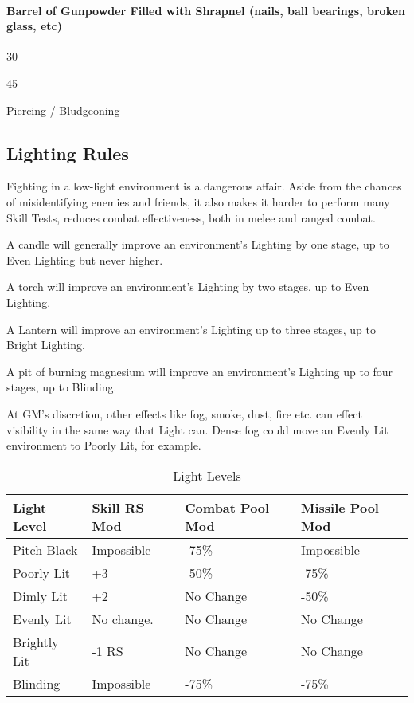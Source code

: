 \documentclass[oneside,11pt,english]{book}
\begin{document}
\paragraph{Barrel of Gunpowder Filled with Shrapnel (nails, ball bearings, broken glass, etc)}
\begin{description}
  [noitemsep]
\item [Radius:] 30
\item [Power:] 45
\item [Type:] Piercing / Bludgeoning
\end{description}

\subsection{Lighting Rules}
\label{sec:lighting-rules}
Fighting in a low-light environment is a dangerous affair. Aside from the
chances of misidentifying enemies and friends, it also makes it harder to
perform many Skill Tests, reduces combat effectiveness, both in melee and ranged
combat.

A candle will generally improve an environment’s Lighting by one stage, up to
Even Lighting but never higher.

A torch will improve an environment’s Lighting by two stages, up to Even
Lighting.

A Lantern will improve an environment’s Lighting up to three stages, up to
Bright Lighting.

A pit of burning magnesium will improve an environment’s Lighting up to four
stages, up to Blinding.

At GM’s discretion, other effects like fog, smoke, dust, fire etc. can effect
visibility in the same way that Light can. Dense fog could move an Evenly Lit
environment to Poorly Lit, for example.
\begin{table}
  \caption{Light Levels}
  \label{tab:light-levels}
  \begin{tabu} to 
    Light Level  & Skill RS Mod & Combat Pool Mod & Missile Pool Mod \\ \toprule
    Pitch Black  & Impossible   & -75\%           & Impossible       \\
    Poorly Lit   & +3           & -50\%           & -75\%            \\
    Dimly Lit    & +2           & No Change       & -50\%            \\
    Evenly Lit   & No change.   & No Change       & No Change        \\
    Brightly Lit & -1 RS        & No Change       & No Change        \\
    Blinding     & Impossible   & -75\%           & -75\%            \\
  \end{tabu}
\end{table}
\end{document}
